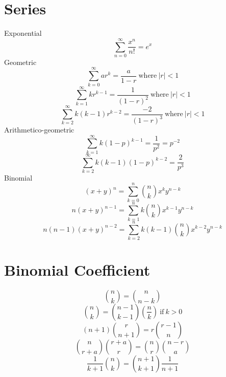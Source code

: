 \documentclass[twocolumn]{amsart}
\begin{document}
\section*{Series}
Exponential
\begin{equation*}
  \sum_{n=0}^{\infty}\frac{x^{n}}{n!} = e^{x}
\end{equation*}
Geometric
\begin{equation*}
  \sum_{k=0}^{\infty}{ar^{k}}=\frac{a}{1-r}~\text{where}~|r|<1
\end{equation*}
\begin{equation*}
  \sum_{k=1}^{\infty}{kr^{k-1}}=\frac{1}{(1-r)^{2}}~\text{where}~|r|<1
\end{equation*}
\begin{equation*}
  \sum_{k=2}^{\infty}{k(k-1)r^{k-2}}=\frac{-2}{(1-r)^{3}}~\text{where}~|r|<1
\end{equation*}
Arithmetico-geometric
\begin{equation*}
  \sum_{k=1}^{\infty}k(1-p)^{k-1}=\frac{1}{p^{2}}=p^{-2}
\end{equation*}
\begin{equation*}
  \sum_{k=2}^{\infty}k(k-1)(1-p)^{k-2}=\frac{2}{p^{3}}
\end{equation*}
Binomial
\begin{equation*}
  (x+y)^{n} = \sum_{k=0}^{n}\binom{n}{k}x^{k}y^{n-k}
\end{equation*}
\begin{equation*}
  n(x+y)^{n-1} = \sum_{k=1}^{n}k\binom{n}{k}x^{k-1}y^{n-k}
\end{equation*}
\begin{equation*}
  n(n-1)(x+y)^{n-2} = \sum_{k=2}^{n}k(k-1)\binom{n}{k}x^{k-2}y^{n-k}
\end{equation*}


\section*{Binomial Coefficient}
\begin{equation*}
  \binom{n}{k} = \binom{n}{n-k}
\end{equation*}
\begin{equation*}
  \binom{n}{k} = \binom{n-1}{k-1} \left( \frac{n}{k} \right)~\text{if}~k > 0
\end{equation*}
\begin{equation*}
  (n+1)\binom{r}{n+1} = r\binom{r-1}{n}
\end{equation*}
\begin{equation*}
  \binom{n}{r+a}\binom{r+a}{r} = \binom{n}{r}\binom{n-r}{a}
\end{equation*}
\begin{equation*}
  \frac{1}{k+1}\binom{n}{k} = \binom{n+1}{k+1}\frac{1}{n+1}
\end{equation*}
\end{document}
